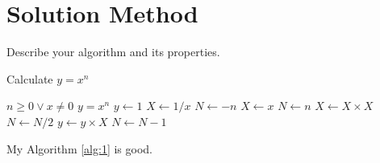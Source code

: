 \section{Solution Method}
\label{sec:method}

Describe your algorithm and its properties.

\begin{algorithm}
\label{alg:1}
\caption{Calculate $y = x^n$}
\begin{algorithmic} 
\REQUIRE $n \geq 0 \vee x \neq 0$
\ENSURE $y = x^n$
\STATE $y \leftarrow 1$
\STATE $X \leftarrow 1 / x$
\STATE $N \leftarrow -n$
\ELSE
\STATE $X \leftarrow x$
\STATE $N \leftarrow n$
\ENDIF
{}
\STATE $X \leftarrow X \times X$
\STATE $N \leftarrow N / 2$
\ELSE[$N$ is odd]
\STATE $y \leftarrow y \times X$
\STATE $N \leftarrow N - 1$
\ENDIF
\ENDWHILE
\end{algorithmic}
\end{algorithm}

\begin{theorem}[Convergence]
    \label{thm:convergence}
    My Algorithm \ref{alg:1} is good.
\end{theorem}